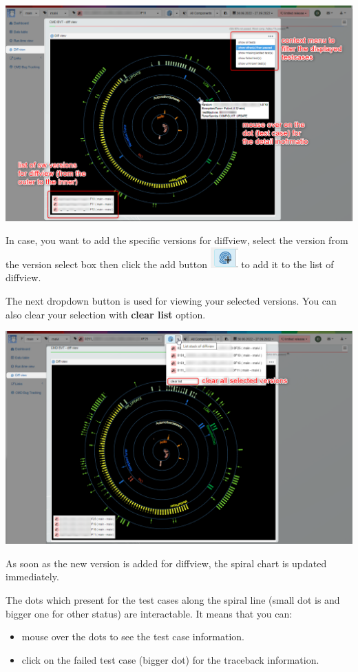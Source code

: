 \includegraphics[width=1\linewidth]{./pictures/diffview/default_detail.png}

In case, you want to add the specific versions for diffview, select the version
from the version select box then click the add button 
\includegraphics{./pictures/diffview/add_button.png}
to add it to the list of diffview. 

The next dropdown button is used for viewing your selected versions.
You can also clear your selection with \textbf{clear list} option.

\includegraphics[width=1\linewidth]{./pictures/diffview/selected_version.png}

As soon as the new version is added for diffview, the spiral chart is updated 
immediately.

The dots which present for the test cases along the spiral line (small dot is 
 and bigger one for other status) are interactable. 
It means that you can:
\begin{itemize}
   \item mouse over the dots to see the test case information.
   \item click on the failed test case (bigger dot) for the traceback 
         information.
\end{itemize}

